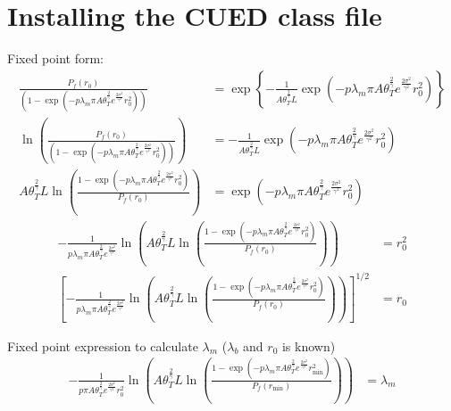 
\chapter{Installing the CUED class file}
Fixed point form:
\begin{align}
\frac{ P_{f}(r_{0}) }{ ( 1- \exp(-p \lambda_{m} \pi A \theta_{T}^{\frac{2}{\gamma}} e^{\frac{2\sigma^2}{\gamma^2}}  r_{0}^2 ) )   }  &= \exp\left\lbrace -\frac{1}{ A \theta_{T}^{\frac{2}{\gamma}}  L }  \exp(-p \lambda_{m} \pi A \theta_{T}^{\frac{2}{\gamma}} e^{  \frac{2\sigma^2}{\gamma^2}  } r_{0}^2)  \right\rbrace \nonumber\\ 
\ln(\frac{ P_{f}(r_{0}) }{ ( 1- \exp(-p \lambda_{m} \pi A \theta_{T}^{\frac{2}{\gamma}} e^{\frac{2\sigma^2}{\gamma^2}}  r_{0}^2 ) )   } ) &= -\frac{1}{ A \theta_{T}^{\frac{2}{\gamma}}  L }  \exp(-p \lambda_{m} \pi A \theta_{T}^{\frac{2}{\gamma}} e^{  \frac{2\sigma^2}{\gamma^2}  } r_{0}^2) \nonumber\\ 
A \theta_{T}^{\frac{2}{\gamma}}  L \ln\left(   \frac{  1- \exp(-p \lambda_{m} \pi A \theta_{T}^{\frac{2}{\gamma}} e^{\frac{2\sigma^2}{\gamma^2}}  r_{0}^2 )  }{   P_{f}(r_{0})   }   \right)  &=  \exp(-p \lambda_{m} \pi A \theta_{T}^{\frac{2}{\gamma}} e^{  \frac{2\sigma^2}{\gamma^2}  } r_{0}^2)   \nonumber  
\end{align}
\begin{align}
-\frac{1}{ p \lambda_{m} \pi A \theta_{T}^{\frac{2}{\gamma}} e^{  \frac{2\sigma^2}{\gamma^2}  } }\ln\left(  A \theta_{T}^{\frac{2}{\gamma}}  L \ln\left(   \frac{  1- \exp(-p \lambda_{m} \pi A \theta_{T}^{\frac{2}{\gamma}} e^{\frac{2\sigma^2}{\gamma^2}}  r_{0}^2 )  }{   P_{f}(r_{0})   }   \right)  \right) &=   r_{0}^2    \nonumber\\
\left[  -\frac{1}{ p \lambda_{m} \pi A \theta_{T}^{\frac{2}{\gamma}} e^{  \frac{2\sigma^2}{\gamma^2}  } }\ln\left(  A \theta_{T}^{\frac{2}{\gamma}}  L \ln\left(   \frac{  1- \exp(-p \lambda_{m} \pi A \theta_{T}^{\frac{2}{\gamma}} e^{\frac{2\sigma^2}{\gamma^2}}  r_{0}^2 )  }{   P_{f}(r_{0})   }   \right)  \right)  \right] ^{1/2}&=   r_{0}    \nonumber
\end{align}

Fixed point expression to calculate $\lambda_m$ ($\lambda_b$ and $r_{0}$ is known)
\begin{align}
-\frac{1}{ p  \pi A \theta_{T}^{\frac{2}{\gamma} } e^{  \frac{2\sigma^2}{\gamma^2}  } r_{0}^2}\ln\left(  A \theta_{T}^{\frac{2}{\gamma}}  L \ln\left(   \frac{  1- \exp(-p \lambda_{m} \pi A \theta_{T}^{\frac{2}{\gamma}} e^{\frac{2\sigma^2}{\gamma^2}}  r_{\text{min}}^2 )  }{   P_{f}(r_{\text{min}})   }   \right)  \right) &=   \lambda_{m}   \nonumber
\end{align}

